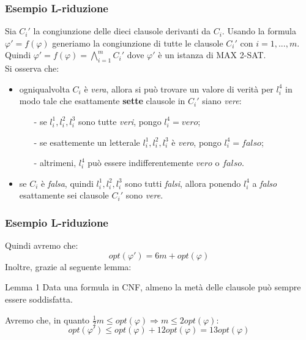 \documentclass{beamer}
\begin{document}
\begin{frame}
    \frametitle{Esempio L-riduzione}
    Sia $C_i'$ la congiunzione delle dieci clausole derivanti da $C_i$. Usando la formula $\varphi' = f(\varphi)$ generiamo la congiunzione di tutte le clausole $C_i'$ con $i = 1,...,m$. Quindi $ \varphi' = f(\varphi) = \bigwedge\limits_{i = 1}^m C_i'$ dove $\varphi'$ è un istanza di MAX 2-SAT.\\
    Si osserva che:
    \begin{itemize}
        \item ogniqualvolta $C_i$ è \textit{vera}, allora si può trovare un valore di verità per $l_i^4$ in modo tale che esattamente \textbf{sette} clausole in $C_i'$ siano \textit{vere}:
            \begin{itemize}
                \item[-] se $l_i^1, l_i^2,l_i^3$ sono tutte \textit{veri}, pongo $l_i^4 = vero$;
                \item[-] se esattemente un letterale $l_i^1, l_i^2,l_i^3$ è \textit{vero}, pongo $l_i^4 = falso$;
                \item[-] altrimeni, $l_i^4$ può essere indifferentemente $vero$ o $falso$.
                \end{itemize}
        \item se $C_i$ è \textit{falsa}, quindi $l_i^1, l_i^2,l_i^3$ sono tutti \textit{falsi}, allora ponendo $l_i^4$ a \textit{falso} esattamente {sei} clausole $C_i'$ sono \textit{vere}.
    \end{itemize}
    

    
\end{frame}

\begin{frame}
    \frametitle{Esempio L-riduzione}
    Quindi avremo che:\\
    $$opt(\varphi')= 6m + opt(\varphi)$$
    Inoltre, grazie al seguente lemma:
    \begin{block}{Lemma 1}
        Data una formula in CNF, almeno la metà delle clausole può sempre essere soddisfatta.
    \end{block}
    Avremo che, in quanto $\frac{1}{2}m \leq opt(\varphi)\Rightarrow m \leq 2opt(\varphi)$:
    $$ opt(\varphi') \leq opt(\varphi)+12opt(\varphi) = 13opt(\varphi) $$
    

\end{frame}
\end{document}
